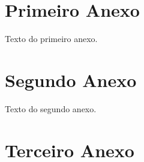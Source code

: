 \begin{anexosenv}

\partanexos

\chapter{Primeiro Anexo}

Texto do primeiro anexo.

\chapter{Segundo Anexo}

Texto do segundo anexo.

\chapter {Terceiro Anexo}


\end{anexosenv}

